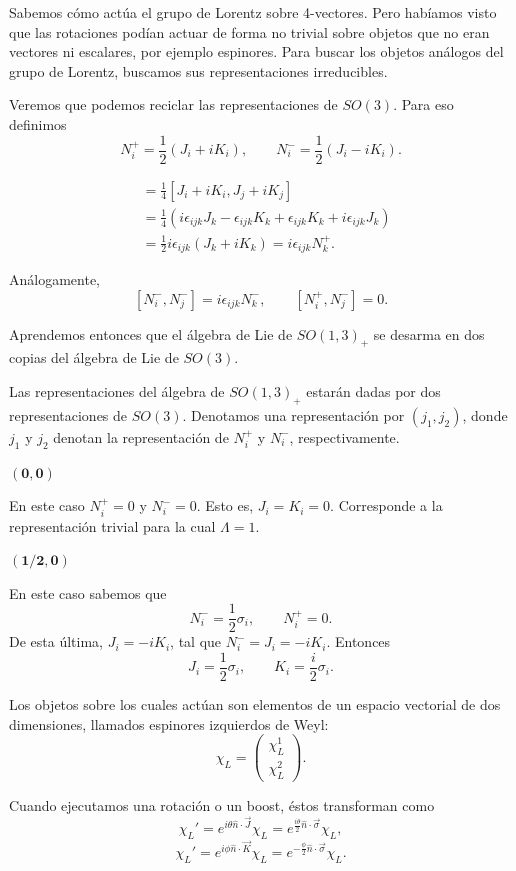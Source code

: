 \documentclass[11pt,a4paper]{article}
\newcommand{\concept}[1]{\textcolor{concept-green}{#1}}
\begin{document}
Sabemos cómo actúa el grupo de Lorentz sobre 4-vectores. Pero habíamos visto que las rotaciones podían actuar de forma no trivial sobre objetos que no eran vectores ni escalares, por ejemplo espinores. Para buscar los objetos análogos del grupo de Lorentz, buscamos sus representaciones irreducibles.

Veremos que podemos reciclar las representaciones de $SO(3)$. Para eso definimos
\[
  N_i^+=\frac12(J_i+iK_i),
  \qquad
  N_i^-=\frac12(J_i-iK_i).
\]

\begin{align*}
  [N_i^+,N_j^+]
  &=\frac14[J_i+iK_i,J_j+iK_j] \\
  &=\frac14\left(
      i\epsilon_{ijk}J_k
      -\epsilon_{ijk}K_k
      +\epsilon_{ijk}K_k
      +i\epsilon_{ijk}J_k
    \right) \\
  &=\frac12 i\epsilon_{ijk}(J_k+iK_k)
   =i\epsilon_{ijk}N_k^+.
\end{align*}

Análogamente,
\[
  [N_i^-,N_j^-]=i\epsilon_{ijk}N_k^-,
  \qquad
  [N_i^+,N_j^-]=0.
\]

Aprendemos entonces que el álgebra de Lie de $SO(1,3)_+$ se desarma en dos copias del álgebra de Lie de $SO(3)$.

Las representaciones del álgebra de $SO(1,3)_+$ estarán dadas por dos representaciones de $SO(3)$. Denotamos una representación por $(j_1,j_2)$, donde $j_1$ y $j_2$ denotan la representación de $N_i^+$ y $N_i^-$, respectivamente.

{\bf $\boldsymbol{(0,0)}$}

En este caso $N_i^+=0$ y $N_i^-=0$. Esto es, $J_i=K_i=0$. Corresponde a la representación trivial para la cual $\Lambda=1$.

{\bf $\boldsymbol{(1/2,0)}$}

En este caso sabemos que
\[
  N_i^-=\frac12\sigma_i,
  \qquad
  N_i^+=0.
\]
De esta última, $J_i=-iK_i$, tal que $N_i^-=J_i=-iK_i$. Entonces
\[
  J_i=\frac12\sigma_i,
  \qquad
  K_i=\frac{i}{2}\sigma_i.
\]

Los objetos sobre los cuales actúan son elementos de un espacio vectorial de dos dimensiones, llamados \concept{espinores izquierdos de Weyl}:
\[
  \chi_L=
  \begin{pmatrix}
    \chi_L^1\\
    \chi_L^2
  \end{pmatrix}.
\]

Cuando ejecutamos una rotación o un boost, éstos transforman como
\[
  \chi_L'
  =e^{i\theta\hat n\cdot\vec J}\chi_L
  =e^{\frac{i\theta}{2}\hat n\cdot\vec\sigma}\chi_L,
\]
\[
  \chi_L'
  =e^{i\phi\hat n\cdot\vec K}\chi_L
  =e^{-\frac{\phi}{2}\hat n\cdot\vec\sigma}\chi_L.
\]
\end{document}

